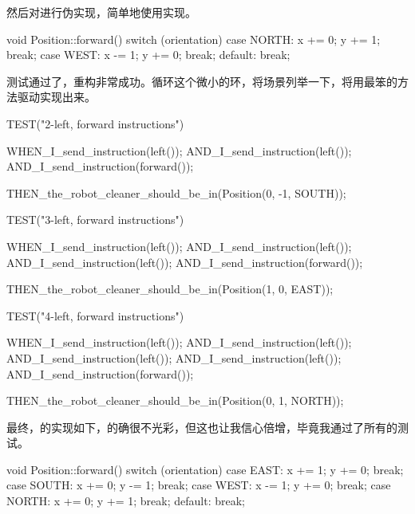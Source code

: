 \begin{content}
然后对进行伪实现，简单地使用实现。

\begin{leftbar}
\begin{c++}[caption={src/robot-cleaner/Position.cpp}]
void Position::forward()
{
    switch (orientation)
    {
    case NORTH:
        x += 0; y += 1;
        break;
    case WEST:
        x -= 1; y += 0;
        break;
    default: break;
    }
}
\end{c++}
\end{leftbar}

测试通过了，重构非常成功。循环这个微小的环，将场景列举一下，将用最笨的方法驱动实现出来。

\begin{leftbar}
\begin{c++}[caption={test/robot-cleaner/TestRobotCleaner.h}]
TEST("2-left, forward instructions")
{
    WHEN_I_send_instruction(left());
    AND_I_send_instruction(left());
    AND_I_send_instruction(forward());
    
    THEN_the_robot_cleaner_should_be_in(Position(0, -1, SOUTH));
}

TEST("3-left, forward instructions")
{
    WHEN_I_send_instruction(left());
    AND_I_send_instruction(left());
    AND_I_send_instruction(left());
    AND_I_send_instruction(forward());
    
    THEN_the_robot_cleaner_should_be_in(Position(1, 0, EAST));
}

TEST("4-left, forward instructions")
{
    WHEN_I_send_instruction(left());
    AND_I_send_instruction(left());
    AND_I_send_instruction(left());
    AND_I_send_instruction(left());
    AND_I_send_instruction(forward());
    
    THEN_the_robot_cleaner_should_be_in(Position(0, 1, NORTH));
}
\end{c++}
\end{leftbar}

最终，的实现如下，的确很不光彩，但这也让我信心倍增，毕竟我通过了所有的测试。

\begin{leftbar}
\begin{c++}[caption={src/robot-cleaner/Position.cpp}]
void Position::forward()
{
    switch (orientation)
    {
    case EAST:
        x += 1; y += 0;
        break;
    case SOUTH:
        x += 0; y -= 1;
        break;
    case WEST:
        x -= 1; y += 0;
        break;
    case NORTH:
        x += 0; y += 1;
        break;
    default: break;
    }
}
\end{c++}
\end{leftbar}


\end{content}
